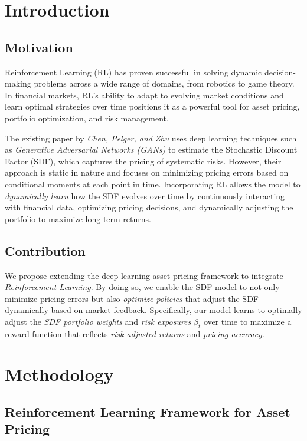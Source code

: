 \section{Introduction}

\subsection{Motivation}

Reinforcement Learning (RL) has proven successful in solving dynamic decision-making problems across a wide range of domains, from robotics to game theory. In financial markets, RL's ability to adapt to evolving market conditions and learn optimal strategies over time positions it as a powerful tool for asset pricing, portfolio optimization, and risk management.

The existing paper by \textit{Chen, Pelger, and Zhu} uses deep learning techniques such as \textit{Generative Adversarial Networks (GANs)} to estimate the Stochastic Discount Factor (SDF), which captures the pricing of systematic risks. However, their approach is static in nature and focuses on minimizing pricing errors based on conditional moments at each point in time. Incorporating RL allows the model to \textit{dynamically learn} how the SDF evolves over time by continuously interacting with financial data, optimizing pricing decisions, and dynamically adjusting the portfolio to maximize long-term returns.

\subsection{Contribution}

We propose extending the deep learning asset pricing framework to integrate \textit{Reinforcement Learning}. By doing so, we enable the SDF model to not only minimize pricing errors but also \textit{optimize policies} that adjust the SDF dynamically based on market feedback. Specifically, our model learns to optimally adjust the \textit{SDF portfolio weights} and \textit{risk exposures} $\beta_t$ over time to maximize a reward function that reflects \textit{risk-adjusted returns} and \textit{pricing accuracy}.

\section{Methodology}

\subsection{Reinforcement Learning Framework for Asset Pricing}

